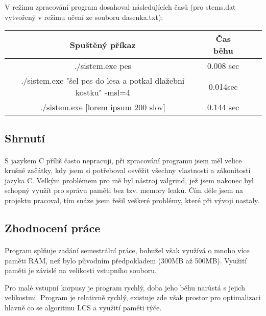 ﻿\documentclass[12pt, a4paper]{article}
\begin{document}
V režimu zpracování program dosahoval následujících časů (pro stems.dat vytvořený v režimu učení ze souboru dasenka.txt):

\begin{center}
 \begin{tabular}{||c c c c||} 
 \hline
 Spuštěný příkaz & Čas běhu  \\
 \hline\hline
 ./sistem.exe pes & 0.008 sec \\ 
 \hline
 ./sistem.exe "šel pes do lesa a potkal dlažební kostku" -msl=4 & 0.014sec \\ 
 \hline
 ./sistem.exe [lorem ipsum 200 slov] & 0.144 sec \\ 
 \hline
\end{tabular}
\end{center}

\subsection{Shrnutí}
\paragraph{}
S jazykem C příliš často nepracuji, při zpracování programu jsem měl velice krušné začátky, kdy jsem si potřeboval osvěžit všechny vlastnosti a zákonitosti jazyka C. Velkým problémem pro mě byl nástroj valgrind, jež jsem nakonec byl schopný využít pro správu paměti bez tzv. memory leaků. Čím déle jsem na projektu pracoval, tím snáze jsem řešil veškeré problémy, které při vývoji nastaly.

\subsection{Zhodnocení práce}
\paragraph{}
Program splňuje zadání semestrální práce, bohužel však využívá o mnoho více paměti RAM, než bylo původním předpokladem (300MB až 500MB). Využití paměti je závislé na velikosti vstupního souboru.

Pro malé vstupní korpusy je program rychlý, doba jeho běhu narůstá s jejich velikostmi. Program je relativně rychlý, existuje zde však prostor pro optimalizaci hlavně co se algoritmu LCS a využití paměti týče.


\newpage
\listoffigures
\end{document}

